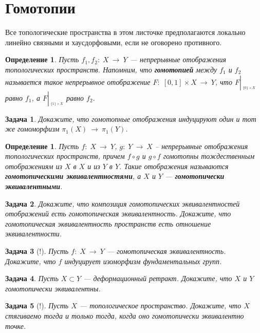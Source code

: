 \documentclass[12pt]{book}
\newcommand{\subs}{\section}
\newcommand{\arrow}{{\:\longrightarrow\:}}
\newcommand{\restrict}[1]{{\left|_{{\phantom{|}\!\!}_{#1}}\right.}}
\theoremstyle{upshape}
\newtheorem{zadacha}{Задача}[chapter]
\theoremstyle{generic}
\newtheorem{opredelenie}[teorema]{Определение}
\theoremstyle{upshapenonumber}
\newcommand{\следствие}{%
     \refstepcounter{teorema}
     {\noindent\bf Следствие \thechapter.\arabic{teorema}:\ }}
\newcommand{\пример}{%
     \refstepcounter{teorema}
     {\noindent\bf Пример \thechapter.\arabic{teorema}:\ }}
\newcommand{\лемма}{%
     \refstepcounter{teorema}
     {\noindent\bf Лемма \thechapter.\arabic{teorema}:\ }}
\newcommand{\теорема}{%
     \refstepcounter{teorema}
     {\noindent\bf Теорема \thechapter.\arabic{teorema}:\ }}
\newcommand{\утверждение}{%
     \refstepcounter{teorema}
     {\noindent\bf Утверждение \thechapter.\arabic{teorema}:\ }}
\begin{document}
{%

\subs{Гомотопии}

Все топологические пространства в этом листочке
предполагаются локально линейно связными и хаусдорфовыми,
если не оговорено противного.

\begin{opredelenie}
Пусть $f_1, f_2:\; X \arrow Y$ --- непрерывные отображения
топологических пространств. Напомним, что {\bf гомотопией}
между $f_1$ и $f_2$ называется такое непрерывное отображение
$F:\; [0,1]\times X \arrow Y$, что
$F\restrict{\{0\}\times X}$ равно $f_1$, а
$F\restrict{\{1\}\times X}$ равно $f_2$. 
\end{opredelenie}

\begin{zadacha}
Докажите, что гомотопные отображения индуцируют
один и тот же гомоморфизм $\pi_1(X)\arrow \pi_1(Y)$.
\end{zadacha}

\begin{opredelenie}
Пусть $f:\; X \arrow Y$, $g:\; Y \arrow X$ --
непрерывные отображения топологических пространств,
причем $f\circ g$ и $g\circ f$ гомотопны тождественным
отображениям из $X$ в $X$ и из $Y$ в $Y$. 
Такие отображения называются {\bf гомотопическими
эквивалентностями}, а $X$ и $Y$ --- {\bf гомотопически
эквивалентными}.
\end{opredelenie}

\begin{zadacha} 
Докажите, что композиция гомотопических эквивалентностей
отображений есть гомотопическая эквивалентность.
Докажите, что гомотопическая эквивалентность пространств
есть отношение эквивалентности.
\end{zadacha}

\begin{zadacha}[!]
Пусть $f:\; X \arrow Y$ --- гомотопическая эквивалентность.
Докажите, что $f$ индуцирует изоморфизм фундаментальных групп.
\end{zadacha}

\begin{zadacha}
Пусть $X\subset Y$ --- 
деформационный ретракт. Докажите, что $X$ и $Y$
гомотопически эквивалентны.
\end{zadacha}

\begin{zadacha}[!]
Пусть $X$ --- топологическое пространство. Докажите, что
$X$ стягиваемо тогда и только тогда, когда оно
гомотопически эквивалентно точке.
\end{zadacha}

}
\end{document}
